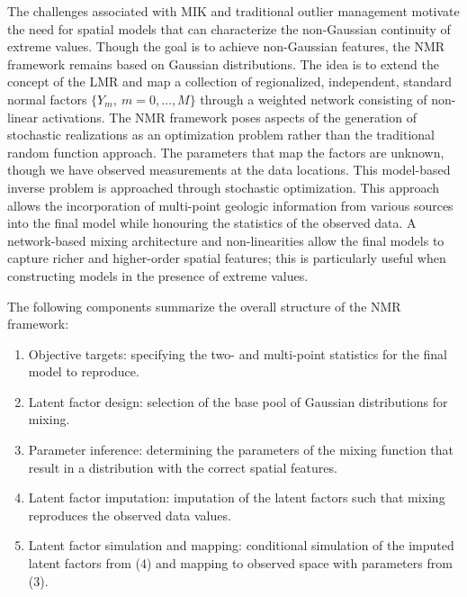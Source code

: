 The challenges associated with \gls{MIK} and traditional outlier management motivate the need for spatial models that can characterize the non-Gaussian continuity of extreme values. Though the goal is to achieve non-Gaussian features, the \gls{NMR} framework remains based on Gaussian distributions. The idea is to extend the concept of the \gls{LMR} and map a collection of regionalized, independent, standard normal factors $\{ Y_{m}, \ m = 0, \dots, M\}$ through a weighted network consisting of non-linear activations. The \gls{NMR} framework poses aspects of the generation of stochastic realizations as an optimization problem rather than the traditional random function approach. The parameters that map the factors are unknown, though we have observed measurements at the data locations. This model-based inverse problem is approached through stochastic optimization. This approach allows the incorporation of multi-point geologic information from various sources into the final model while honouring the statistics of the observed data. A network-based mixing architecture and non-linearities allow the final models to capture richer and higher-order spatial features; this is particularly useful when constructing models in the presence of extreme values.

The following components summarize the overall structure of the \gls{NMR} framework:
\begin{enumerate}[noitemsep]
    \item Objective targets: specifying the two- and multi-point statistics for the final model to reproduce.
    \item Latent factor design: selection of the base pool of Gaussian distributions for mixing.
    \item Parameter inference: determining the parameters of the mixing function that result in a distribution with the correct spatial features.
    \item Latent factor imputation: imputation of the latent factors such that mixing reproduces the observed data values.
    \item Latent factor simulation and mapping: conditional simulation of the imputed latent factors from (4) and mapping to observed space with parameters from (3).
\end{enumerate}

